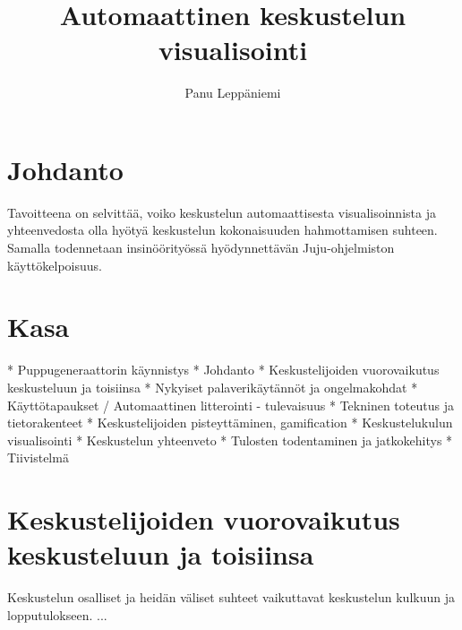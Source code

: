 \documentclass[11pt,a4paper,oneside]{memoir}
\author{Panu Leppäniemi}
\title{Automaattinen keskustelun visualisointi}
\begin{document}
\pagestyle{myheadings}
\markright{}



\pagestyle{empty} %
\tableofcontents*
\pagestyle{empty} %
\clearpage
\pagestyle{plain}




\setcounter{page}{1} %

\chapter{Johdanto}
Tavoitteena on selvittää, voiko keskustelun automaattisesta visualisoinnista ja yhteenvedosta olla hyötyä keskustelun kokonaisuuden hahmottamisen suhteen. Samalla todennetaan insinöörityössä hyödynnettävän Juju-ohjelmiston käyttökelpoisuus.

\chapter{Kasa}
* Puppugeneraattorin käynnistys
* Johdanto
* Keskustelijoiden vuorovaikutus keskusteluun ja toisiinsa
* Nykyiset palaverikäytännöt ja ongelmakohdat
* Käyttötapaukset / Automaattinen litterointi - tulevaisuus
* Tekninen toteutus ja tietorakenteet
* Keskustelijoiden pisteyttäminen, gamification
* Keskustelukulun visualisointi
* Keskustelun yhteenveto
* Tulosten todentaminen ja jatkokehitys
* Tiivistelmä

\chapter{Keskustelijoiden vuorovaikutus keskusteluun ja toisiinsa}
Keskustelun osalliset ja heidän väliset suhteet vaikuttavat keskustelun kulkuun ja lopputulokseen.
...
\end{document}
